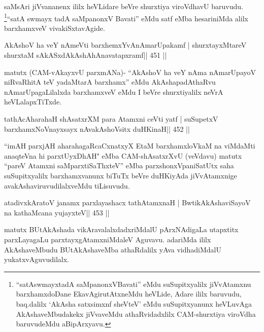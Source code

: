 \begin{artha}
saMsAri jiVvananenx ililx heVLidare beVre shurxtiya viroVdhavU
baruvudu. \footnote{``satAswmayxtadA saMpanonxVBavati'' eMdu suSupitxyalilx jiVvAtamxnu
barxhamxdoDane EkavAgirutAtxneMdu heVLide, Adare ililx baruvudu,
baq.dalilx `AkAsha satxsimxnf sheVteV' eMdu suSupitxyanunx heVLuvAga
AkAshaveMbudakekx jiVvaveMdu athaRvidadxlilx CAM-shurxtiya viroVdha
baruvudeMdu aBipArxyavu.}``satA swmayx tadA saMpanonxV Bavati'' eMdu satf eMba
hesariniMda alilx barxhamxveV vivakiSxtavAgide.
\end{artha}


\begin{shl}
AkAshoV ha veY nAmeVti barxhemxYvAnAmarUpakamf |
shurxtayxMtareV shurxtaM sAkASxdAkAshAhAnavatapxramf\hfill || 451 ||
\end{shl}

\begin{artha}
matutx (CAM-vAkayxvU parxmANa)- ``AkAshoV ha veY nAma nAmarUpayoV niRvaRhitA teV yadaMtarA barxhamx'' eMdu AkAshapadAthaRvu nAmarUpagaLilalxda barxhamxveV eMdu I beVre shurxtiyalilx neVrA heVLalapxTiTxde.
\end{artha}

\begin{shl}
tathAcAharahaH shAsatxrXM para Atamxni ceVti yatf |
suSupetxV barxhamxNoV\s nayxsayx nAvakAshoV\s sitx duHKinaH\hfill || 452 ||
\end{shl}

\begin{artha}
``imAH parxjAH aharahagaRcaCxnatxyX EtaM barxhamxloVkaM na viMdaMti anaqteVna hi parxtUyxDhAH" eMba CAM-shAsatxrXvU (veVdavu) matutx ``pareV Atamxni saMparxtiSaThxteV'' eMba parxshonxVpaniSatUtx saha suSupitxyalilx barxhamxvanunx biTuTx beVre duHKiyAda jiVvAtamxnige avakAshaviruvudilalxveMdu tiLisuvudu.
\end{artha}

\begin{shl}
atadivxkAratoV janamx parxlayashacx tathA\s\s tamxnaH |
BwtikAkAshaviSayoV na kathaMcana yujayxteV\hfill || 453 ||
\end{shl}

\begin{artha}
matutx BUtAkAshada vikAravalalxdadxriMdalU pArxNAdigaLa utapxtitx parxLayagaLu parxtayxgAtamxniMdaleV Aguvavu. adariMda ililx AkAshaveMbudu BUtAkAshaveMba athaRdalilx yAva vidhadiMdalU yukatxvAguvudilalx.
\end{artha}



